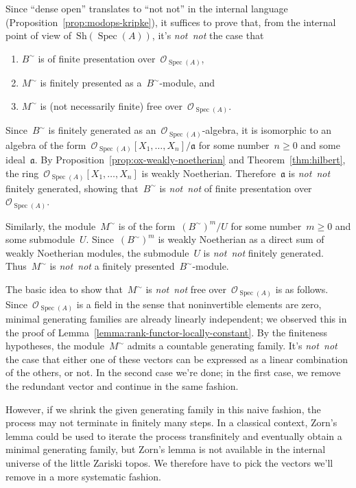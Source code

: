 \documentclass[10pt,reqno,a4paper]{amsbook}
\makeatletter
\theoremstyle{definition}
\theoremstyle{plain}
\theoremstyle{remark}
\renewcommand{\O}{\mathcal{O}}
\newcommand{\aaa}{\mathfrak{a}}
\newcommand{\Sh}{\mathrm{Sh}}
\DeclareMathOperator{\Spec}{Spec}
\newcommand{\?}{\,{:}\,}
\renewcommand{\_}{\mathpunct{.}\,}
\newcommand{\notnot}{\emph{not~not}\xspace}
\renewenvironment{proof}[1][\proofname]{\par
  \pushQED{\qed}%
  \normalfont \topsep6\p@\@plus6\p@\relax
  \trivlist
  \item[\hskip\labelsep
        \itshape
    #1\@addpunct{.}]\ignorespaces
}{%
  \popQED\endtrivlist\@endpefalse
}
\makeatother
\begin{document}
\begin{proof}[Proof of Theorem~\ref{thm:generic-freeness}]
Since ``dense open'' translates to ``not not'' in the internal language
(Proposition~\ref{prop:modops-kripke}), it suffices to prove that, from the
internal point of view of~$\Sh(\Spec(A))$, it's \notnot the case that
\begin{enumerate}
\item $B^\sim$ is of finite presentation over~$\O_{\Spec(A)}$,
\item $M^\sim$ is finitely presented as a~$B^\sim$-module, and
\item $M^\sim$ is (not necessarily finite) free over~$\O_{\Spec(A)}$.
\end{enumerate}

Since~$B^\sim$ is finitely generated as an~$\O_{\Spec(A)}$-algebra, it is
isomorphic to an algebra of the form~$\O_{\Spec(A)}[X_1,\ldots,X_n]/\aaa$ for
some number~$n \geq 0$ and some ideal~$\aaa$. By
Proposition~\ref{prop:ox-weakly-noetherian} and Theorem~\ref{thm:hilbert}, the
ring~$\O_{\Spec(A)}[X_1,\ldots,X_n]$ is weakly Noetherian. Therefore~$\aaa$ is
\notnot finitely generated, showing that~$B^\sim$ is \notnot of finite
presentation over~$\O_{\Spec(A)}$.

Similarly, the module~$M^\sim$ is of the form~$(B^\sim)^m/U$ for some number~$m
\geq 0$ and some submodule~$U$. Since~$(B^\sim)^m$ is weakly Noetherian as a
direct sum of weakly Noetherian modules, the submodule~$U$ is \notnot finitely
generated. Thus~$M^\sim$ is \notnot a finitely presented~$B^\sim$-module.

The basic idea to show that~$M^\sim$ is \notnot free over~$\O_{\Spec(A)}$ is as
follows. Since~$\O_{\Spec(A)}$ is a field in the sense that noninvertible
elements are zero, minimal generating families are already linearly independent;
we observed this in the proof of Lemma~\ref{lemma:rank-functor-locally-constant}.
By the finiteness hypotheses, the module~$M^\sim$ admits a countable
generating family. It's \notnot the case that either one of these vectors can be
expressed as a linear combination of the others, or not. In the second case
we're done; in the first case, we remove the redundant vector and continue in
the same fashion.

However, if we shrink the given generating family in this naive fashion, the
process may not terminate in finitely many steps. In a classical context,
Zorn's lemma could be used to iterate the process transfinitely and eventually
obtain a minimal generating family, but Zorn's lemma is not available in the
internal universe of the little Zariski topos. We therefore have to pick the
vectors we'll remove in a more systematic fashion.


\end{proof}
\end{document}
